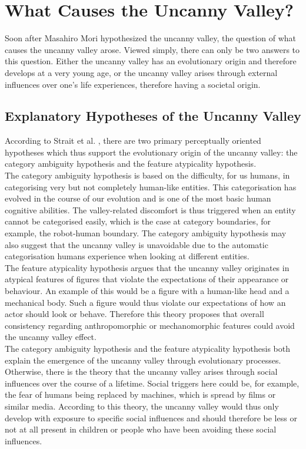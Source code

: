 \chapter{What Causes the Uncanny Valley?}   
\label{chap:4}
Soon after Masahiro Mori hypothesized the uncanny valley, the question of what causes the uncanny valley arose. Viewed simply, there can only be two answers to this question. Either the uncanny valley has an evolutionary origin and therefore develops at a very young age, or the uncanny valley arises through external influences over one's life experiences, therefore having a societal origin. 
\section{Explanatory Hypotheses of the Uncanny Valley}
According to Strait et al. \cite{childrens_responding}, there are two primary perceptually oriented hypotheses which thus support the evolutionary origin of the uncanny valley: the category ambiguity hypothesis and the feature atypicality hypothesis.\\
The category ambiguity hypothesis \cite{childrens_responding} is based on the difficulty, for us humans, in categorising very but not completely human-like entities. This categorisation has evolved in the course of our evolution and is one of the most basic human cognitive abilities. The valley-related discomfort is thus triggered when an entity cannot be categorised easily, which is the case at category boundaries, for example, the robot-human boundary. The category ambiguity hypothesis may also suggest that the uncanny valley is unavoidable due to the automatic categorisation humans experience when looking at different entities.\\
The feature atypicality hypothesis \cite{childrens_responding} argues that the uncanny valley originates in atypical features of figures that violate the expectations of their appearance or behaviour. An example of this would be a figure with a human-like head and a mechanical body. Such a figure would thus violate our expectations of how an actor should look or behave. Therefore this theory proposes that overall consistency regarding anthropomorphic or mechanomorphic features could avoid the uncanny valley effect.\\
The category ambiguity hypothesis and the feature atypicality hypothesis both explain the emergence of the uncanny valley through evolutionary processes. Otherwise, there is the theory that the uncanny valley arises through social influences over the course of a lifetime. Social triggers here could be, for example, the fear of humans being replaced by machines, which is spread by films or similar media. According to this theory, the uncanny valley would thus only develop with exposure to specific social influences and should therefore be less or not at all present in children or people who have been avoiding these social influences. 
